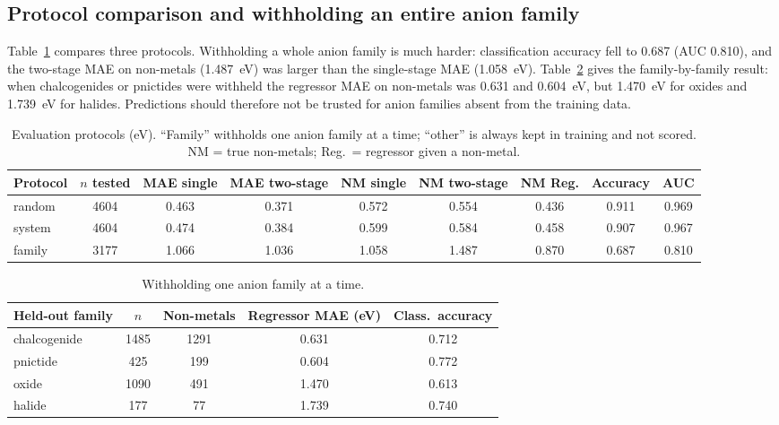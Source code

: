 \documentclass[11pt,a4paper]{article}
\begin{document}
\subsection{Protocol comparison and withholding an entire anion family}
Table~\ref{tab:prot} compares three protocols. Withholding a whole anion family is much harder: classification accuracy fell to 0.687 (AUC 0.810), and the two-stage MAE on non-metals (1.487~eV) was larger than the single-stage MAE (1.058~eV).
Table~\ref{tab:fh} gives the family-by-family result: when chalcogenides or pnictides were withheld the regressor MAE on non-metals was 0.631 and 0.604~eV, but 1.470~eV for oxides and 1.739~eV for halides.
Predictions should therefore not be trusted for anion families absent from the training data.

\begin{table}[H]\centering\footnotesize\setlength{\tabcolsep}{3.5pt}\caption{Evaluation protocols (eV). ``Family'' withholds one anion family at a time; ``other'' is always kept in training and not scored. NM = true non-metals; Reg.\ = regressor given a non-metal.}\label{tab:prot}
\begin{tabular}{lcccccccc}\toprule Protocol & $n$ tested & MAE single & MAE two-stage & NM single & NM two-stage & NM Reg. & Accuracy & AUC\\\midrule
random & 4604 & 0.463 & 0.371 & 0.572 & 0.554 & 0.436 & 0.911 & 0.969 \\
system & 4604 & 0.474 & 0.384 & 0.599 & 0.584 & 0.458 & 0.907 & 0.967 \\
family & 3177 & 1.066 & 1.036 & 1.058 & 1.487 & 0.870 & 0.687 & 0.810 \\
\bottomrule\end{tabular}\end{table}

\begin{table}[H]\centering\small\caption{Withholding one anion family at a time.}\label{tab:fh}
\begin{tabular}{lcccc}\toprule Held-out family & $n$ & Non-metals & Regressor MAE (eV) & Class.\ accuracy\\\midrule
chalcogenide & 1485 & 1291 & 0.631 & 0.712 \\
pnictide & 425 & 199 & 0.604 & 0.772 \\
oxide & 1090 & 491 & 1.470 & 0.613 \\
halide & 177 & 77 & 1.739 & 0.740 \\
\bottomrule\end{tabular}\end{table}
\end{document}
